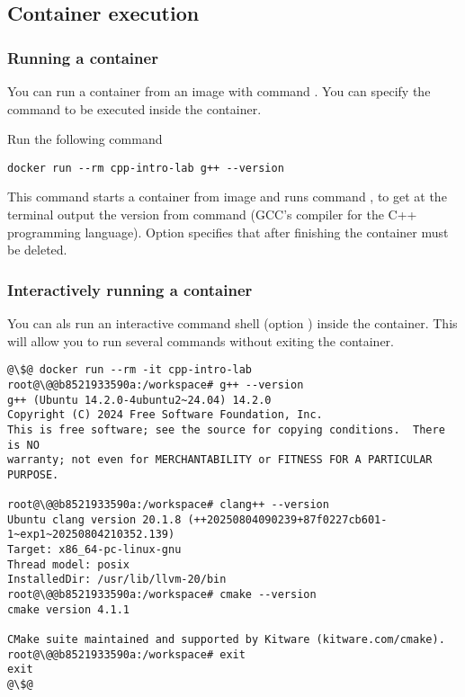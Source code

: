 \subsection{Container execution}

\subsubsection{Running a container}

You can run a container from an image with command
. 
You can specify the command to be executed inside the container.

Run the following command

\begin{lstlisting}[style=terminal]
docker run --rm cpp-intro-lab g++ --version
\end{lstlisting}

This command starts a container from image 
and runs command , 
to get at the terminal output the version from command  
(GCC's compiler for the C++ programming language).
Option 
specifies that after finishing the container must be deleted.

\subsubsection{Interactively running a container}

You can als run an interactive command shell
(option ) inside the container.
This will allow you to run several commands without exiting the container.

\begin{lstlisting}[style=terminal,escapechar=@]
@\$@ docker run --rm -it cpp-intro-lab
root@\@@b8521933590a:/workspace# g++ --version
g++ (Ubuntu 14.2.0-4ubuntu2~24.04) 14.2.0
Copyright (C) 2024 Free Software Foundation, Inc.
This is free software; see the source for copying conditions.  There is NO
warranty; not even for MERCHANTABILITY or FITNESS FOR A PARTICULAR PURPOSE.

root@\@@b8521933590a:/workspace# clang++ --version
Ubuntu clang version 20.1.8 (++20250804090239+87f0227cb601-1~exp1~20250804210352.139)
Target: x86_64-pc-linux-gnu
Thread model: posix
InstalledDir: /usr/lib/llvm-20/bin
root@\@@b8521933590a:/workspace# cmake --version
cmake version 4.1.1

CMake suite maintained and supported by Kitware (kitware.com/cmake).
root@\@@b8521933590a:/workspace# exit
exit
@\$@
\end{lstlisting}

